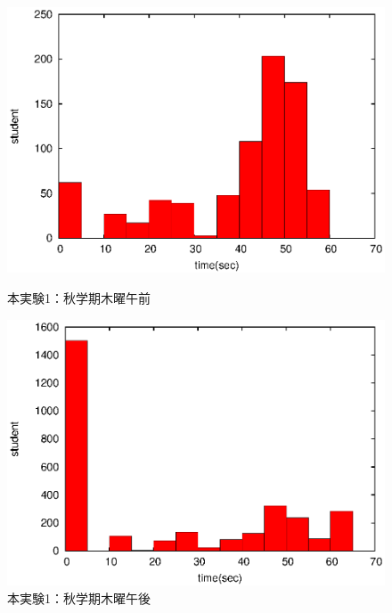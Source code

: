 \documentclass[a4paper,10pt]{jarticle}
\begin{document}
\begin{figure}[htpb]                        
\begin{minipage} {0.5\hsize}                             
\begin{center}                              
\includegraphics[bb=0 0 390 248,clip,width=\hsize]{xTh12_hist.eps}   
\caption{本実験1：秋学期木曜午前}                              
\label{xTh12}                                
\end{center}                                    
\end{minipage}                                 
\begin{minipage}{0.5\hsize}                                            
\begin{center}                              
\includegraphics[bb=0 0 390 248,clip,width=\hsize]{xTh345_hist.eps}   
\caption{本実験1：秋学期木曜午後}                              
\label{xTh345}                                
\end{center}                                    
\end{minipage}                                 
\end{figure}                                 
\end{document}
